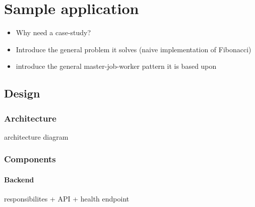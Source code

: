 \chapter{Sample application}

\begin{itemize}
	\item Why need a case-study?
	\item Introduce the general problem it solves (naive implementation of Fibonacci)
	\item introduce the general master-job-worker pattern it is based upon

\end{itemize}


\section{Design}

\subsection{Architecture}

architecture diagram

\subsection{Components}

\subsubsection{Backend}

responsibilites + API + health endpoint

